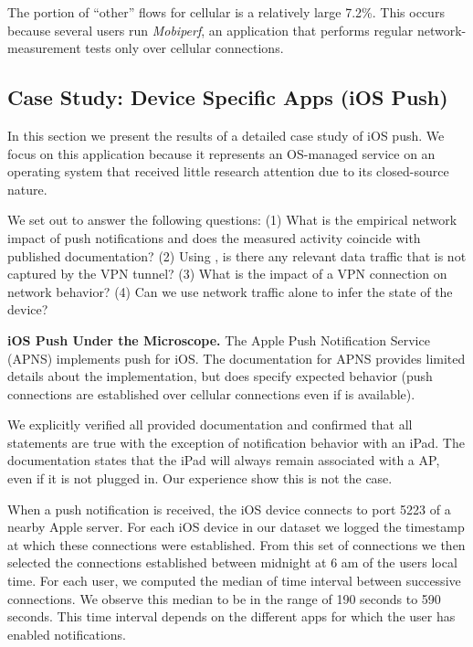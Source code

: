 The portion of ``other'' flows for cellular is a relatively large 7.2\%. This occurs because 
several users run \emph{Mobiperf}, an application that performs regular network-measurement 
tests only over cellular connections.





\subsection{Case Study: Device Specific Apps (iOS Push)}
\label{sec:case-study-ios}

In this section we present the results of a detailed case study 
of iOS push. We focus on this application because it represents 
an OS-managed service on an operating system that received 
little research attention due to its closed-source nature. 

We set out to answer the following questions: (1) What is the 
empirical network impact of push notifications and does the 
measured activity coincide with published documentation?
(2) Using \meddle, is there any relevant data traffic that is 
not captured by the VPN tunnel? (3) What is the impact of 
a VPN connection on network behavior? (4) Can we use 
network traffic alone to infer the state of the device?

\noindent \textbf{iOS Push Under the Microscope.} 
The Apple Push Notification Service 
(APNS) implements push for iOS. The documentation for APNS provides limited details about 
the implementation, but does specify expected behavior (\eg push 
connections are established over cellular connections even if 
\wifi is available). 

We explicitly verified all provided documentation and confirmed that 
all statements are true with the exception of notification behavior 
with an iPad. The documentation states that the iPad will always 
remain associated with a \wifi AP, even if it is not plugged in. Our 
experience show this is not the case.

When a push notification is received, the iOS device connects to port
5223 of a nearby Apple server. For each iOS device in our dataset we
logged the timestamp at which these connections were established. From
this set of connections we then selected the connections established
between midnight at 6 am of the users local time. For each user, we
computed the median of time interval between successive
connections. We observe this median to be in the range of 190 seconds
to 590 seconds. This time interval depends on the different apps for
which the user has enabled notifications. 

